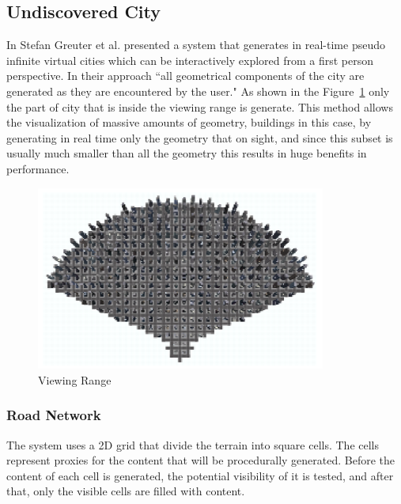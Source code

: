 
\subsection{Undiscovered City} %
\label{sub:undiscovered_city}

In \cite{Greuter2003} Stefan Greuter et al. presented a system that generates in real-time pseudo infinite virtual cities which can be interactively explored from a first person perspective. In their approach ``all geometrical components of the city are generated as they are encountered by the user." As shown in the Figure~\ref{fig:viewingRange} only the part of city that is inside the viewing range is generate. This method allows the visualization of massive amounts of geometry, buildings in this case, by generating in real time only the geometry that on sight, and since this subset is usually much smaller than all the geometry this results in huge benefits in performance.

\begin{figure}[htbp]
	\centering
	\includegraphics[width=0.85\textwidth]{img/Real-Time-procedural-generation/viewing-range.png}
	\caption{Viewing Range}
	\label{fig:viewingRange}
\end{figure}

\subsubsection{Road Network} %
\label{ssub:road_network}

The system uses a 2D grid that divide the terrain into square cells. The cells represent proxies for the content that will be procedurally generated. Before the content of each cell is generated, the potential visibility of it is tested, and after that, only the visible cells are filled with content.

